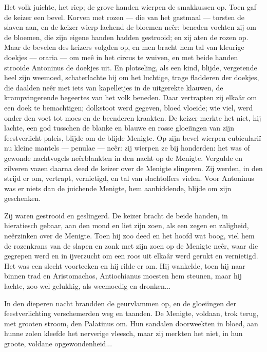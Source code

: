 \documentclass[a4paper, 12pt, oneside, dutch]{article}
\begin{document}
Het volk juichte, het riep; de grove handen wierpen de smakkussen op. Toen gaf de keizer een bevel. Korven met rozen --- die van het gastmaal --- torsten de slaven aan, en de keizer wierp lachend de bloemen neêr: beneden vochten zij om de bloemen, die zijn eigene handen hadden gestrooid; en zij aten de rozen op. Maar de bevelen des keizers volgden op, en men bracht hem tal van kleurige doekjes --- oraria --- om meê in het circus te wuiven, en met beide handen strooide Antoninus de doekjes uit. En plotseling, als een kind, blijde, vergetende heel zijn weemoed, schaterlachte hij om het luchtige, trage fladderen der doekjes, die daalden neêr met iets van kapelletjes in de uitgerekte klauwen, de krampvingerende begeertes van het volk beneden. Daar vertrapten zij elkaâr om een doek te bemachtigen; dolkstoot werd gegeven, bloed vloeide; wie viel, werd onder den voet tot moes en de beenderen kraakten. De keizer merkte het niet, hij lachte, een god tusschen de blanke en blauwe en rosse gloeiïngen van zijn feestverlicht paleis, blijde om de blijde Menigte. Op zijn bevel wierpen cubiculariï nu kleine mantels --- penulae --- neêr: zij wierpen ze bij honderden: het was of gewonde nachtvogels neêrblankten in den nacht op de Menigte. Vergulde en zilveren vazen daarna deed de keizer over de Menigte slingeren. Zij werden, in den strijd er om, vertrapt, vernietigd, en tal van slachtoffers vielen. Voor Antoninus was er niets dan de juichende Menigte, hem aanbiddende, blijde om zijn geschenken.

Zij waren gestrooid en geslingerd. De keizer bracht de beide handen, in hieratiesch gebaar, aan den mond en liet zijn zoen, als een zegen en zaligheid, neêrzinken over de Menigte. Toen hij zoo deed en het hoofd wat boog, viel hem de rozenkrans van de slapen en zonk met zijn zoen op de Menigte neêr, waar die gegrepen werd en in ijverzucht om een roos uit elkaâr werd gerukt en vernietigd. Het was een slecht voorteeken en hij rilde er om. Hij wankelde, toen hij naar binnen trad en Aristomachos, Antiochianus moesten hem steunen, maar hij lachte, zoo wel gelukkig, als weemoedig en dronken...

In den dieperen nacht brandden de geurvlammen op, en de gloeiïngen der feestverlichting verschemerden weg en taanden. De Menigte, voldaan, trok terug, met grooten stroom, den Palatinus om. Hun sandalen doorweekten in bloed, aan hunne zolen kleefde het nerverige vleesch, maar zij merkten het niet, in hun groote, voldane opgewondenheid...

\subsection{}
\end{document}
